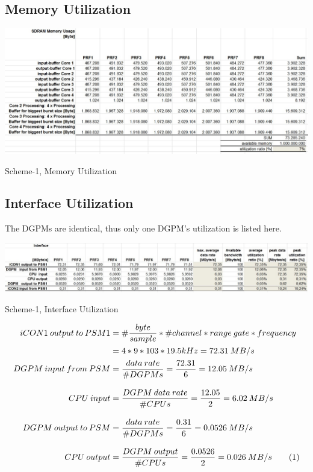 \subsection{Memory Utilization}
\label{app:sch1:mem_util}
\begin{table}[h!]
	\centering
	\includegraphics[width=160mm]{figures/aa_scheme1_mem_util}
	\caption{Scheme-1, Memory Utilization}
	\label{fig:existing_analysis:aa_scheme1_mem_util}
\end{table}

\subsection{Interface Utilization}
\label{app:sch1:mem_util}
The DGPMs are identical, thus only one DGPM's utilization is listed here.
\begin{table}[h!]
	\centering
	\includegraphics[width=160mm]{figures/aa_scheme1_interface_util}
	\caption{Scheme-1, Interface Utilization}
	\label{fig:existing_analysis:aa_scheme1_interface_util}
\end{table}
\begin{align*}
	\label{equ:aa:scheme1:interface_util}
	iCON1 \: output \: to \: PSM1 &= \#\frac{byte}{sample} * \#channel * range \: gate * frequency \\
	&= 4 * 9 * 103 * 19.5kHz = 72.31 \: MB/s \\
	DGPM \: input \: from \: PSM &= \frac{data \: rate}{\#DGPMs} = \frac{72.31}{6} = 12.05 \: MB/s \\[0.3cm]
	CPU \: input &= \frac{DGPM \: data \: rate}{\#CPUs} = \frac{12.05}{2} = 6.02 \: MB/s \\[0.3cm]
	DGPM \: output \: to \: PSM &= \frac{data \: rate}{\#DGPMs} = \frac{0.31}{6} = 0.0526 \: MB/s \\[0.3cm]
	CPU \: output &= \frac{DGPM \: output}{\#CPUs} = \frac{0.0526}{2} = 0.026 \: MB/s \stepcounter{equation}\tag{\theequation}
\end{align*}

